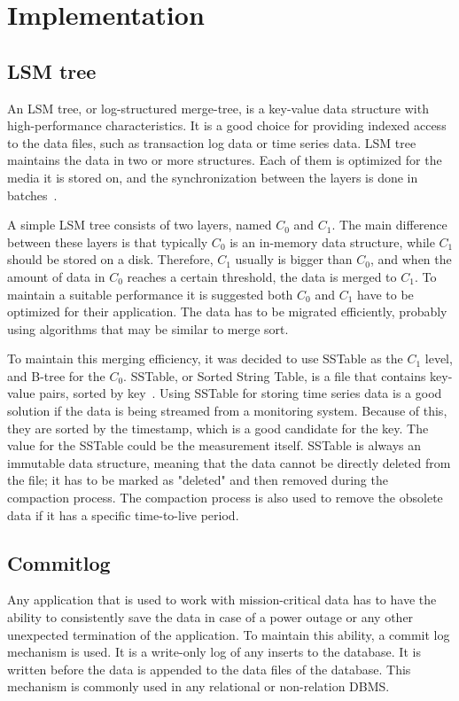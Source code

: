 \section{Implementation}
\subsection{LSM tree}
An LSM tree, or log-structured merge-tree, is a key-value data structure with high-performance characteristics. It is a good choice for providing indexed access to the data files, such as transaction log data or time series data. LSM tree maintains the data in two or more structures. Each of them is optimized for the media it is stored on, and the synchronization between the layers is done in batches~\cite{lsm_tree_orig}.

A simple LSM tree consists of two layers, named $C_0$ and $C_1$. The main difference between these layers is that typically $C_0$ is an in-memory data structure, while $C_1$ should be stored on a disk. Therefore, $C_1$ usually is bigger than $C_0$, and when the amount of data in $C_0$ reaches a certain threshold, the data is merged to $C_1$. To maintain a suitable performance it is suggested both $C_0$ and $C_1$ have to be optimized for their application. The data has to be migrated efficiently, probably using algorithms that may be similar to merge sort.

To maintain this merging efficiency, it was decided to use SSTable as the $C_1$ level, and B-tree for the $C_0$. SSTable, or Sorted String Table, is a file that contains key-value pairs, sorted by key~\cite{sstable}. Using SSTable for storing time series data is a good solution if the data is being streamed from a monitoring system. Because of this, they are sorted by the timestamp, which is a good candidate for the key. The value for the SSTable could be the measurement itself. SSTable is always an immutable data structure, meaning that the data cannot be directly deleted from the file; it has to be marked as "deleted" and then removed during the compaction process. The compaction process is also used to remove the obsolete data if it has a specific time-to-live period.

\subsection{Commitlog}
Any application that is used to work with mission-critical data has to have the ability to consistently save the data in case of a power outage or any other unexpected termination of the application. To maintain this ability, a commit log mechanism is used. It is a write-only log of any inserts to the database. It is written before the data is appended to the data files of the database. This mechanism is commonly used in any relational or non-relation DBMS.

